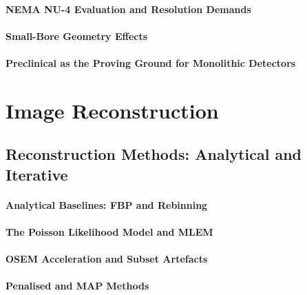 \paragraph{NEMA NU-4 Evaluation and Resolution Demands}

\paragraph{Small-Bore Geometry Effects}

\paragraph{Preclinical as the Proving Ground for Monolithic Detectors}

\section{Image Reconstruction}
\label{sec:reconstruction}

\subsection{Reconstruction Methods: Analytical and Iterative}
\label{sec:iterative}

\paragraph{Analytical Baselines: FBP and Rebinning}

\paragraph{The Poisson Likelihood Model and MLEM}

\paragraph{OSEM Acceleration and Subset Artefacts}

\paragraph{Penalised and MAP Methods}

